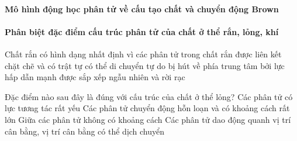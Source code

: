 \paragraph{Mô hình động học phân tử về cấu tạo chất và chuyển động Brown}







\paragraph{Phân biệt đặc điểm cấu trúc phân tử của chất ở thể rắn, lỏng, khí}


\begin{ex}
	{\color{red}\footnotesize\ttfamily [L12C1B1-TN-4]}\par %
	Chất rắn có hình dạng nhất định vì các phân tử trong chất rắn
	\choice
	{\True được liên kết chặt chẽ và có trật tự}
	{có thể di chuyển tự do}
	{bị hút về phía trung tâm bởi lực hấp dẫn mạnh}
	{được sắp xếp ngẫu nhiên và rời rạc}
\end{ex}

\begin{ex}
	{\color{red}\footnotesize\ttfamily [L12C1B1-TN-6]}\par %
	Đặc điểm nào sau đây là đúng với cấu trúc của chất ở thể lỏng?
	\choice
	{Các phân tử có lực tương tác rất yếu}
	{Các phân tử chuyển động hỗn loạn và có khoảng cách rất lớn}
	{Giữa các phân tử không có khoảng cách}
	{\True Các phân tử dao động quanh vị trí cân bằng, vị trí cân bằng có thể dịch chuyển}
\end{ex}

